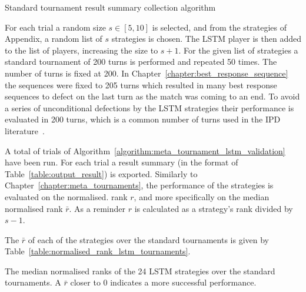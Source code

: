 \begin{algorithm}[!htbp]
    \;
    \caption{Standard tournament result summary collection algorithm}
    \label{algorithm:meta_tournament_lstm_validation}
\end{algorithm}

For each trial a random size \(s \in [5, 10]\) is selected, and from the
\numberofstrategiesbestsequences strategies of Appendix, a random list of \(s\) strategies is chosen. %
The LSTM player is then added
to the list of players, increasing the size to \(s + 1\). For the given list of
strategies a standard tournament of 200 turns is performed and repeated 50
times. The number of turns is fixed at 200. In
Chapter~\ref{chapter:best_response_sequence} the sequences were fixed to 205
turns which resulted in many best response sequences to defect on the last turn
as the match was coming to an end. To avoid a series of 
unconditional defections by the LSTM strategies their performance is evaluated
in  200 turns, which is a common number of turns used in the IPD literature~\cite{Axelrod1980a, Axelrod1980b, Harper2017, Knight2016}.

A total of \metatournamentslstm trials of
Algorithm~\ref{algorithm:meta_tournament_lstm_validation} have been run. For
each trial a result summary (in the format of Table~\ref{table:output_result})
is exported. Similarly to Chapter~\ref{chapter:meta_tournaments}, the performance of the strategies is evaluated on the normalised.
rank \(r\), and more specifically on the median normalised rank \(\bar{r}\). As
a reminder \(r\) is calculated as a strategy's rank divided by \(s-1\).

The \(\bar{r}\) of each of the \lstmstrategies strategies over the \metatournamentslstm
standard tournaments is given by Table~\ref{table:normalised_rank_lstm_tournaments}.

\begin{table}[!htbp]
    \begin{center}
    \resizebox{.9\textwidth}{!}{
        
    }
\end{center}
\caption{The median normalised ranks of the 24 LSTM strategies over the standard
tournaments. A \(\bar{r}\) closer to 0 indicates a more successful performance.}
\label{table:normalised_rank_lstm_tournaments}
\end{table}

